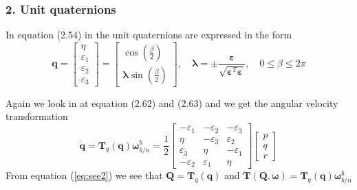 \subsubsection*{2. Unit quaternions}

In equation (2.54) in \cite{Fossen2011} the unit quaternions are expressed in the form 
\begin{equation}
    \mathbf{q}=
    \begin{bmatrix}
        \eta \\ \varepsilon_1 \\ \varepsilon_2 \\ \varepsilon_3
    \end{bmatrix}
    =
    \begin{bmatrix}
            \cos\left(\frac{\beta}{2}\right) \\ \boldsymbol{\lambda} \sin\left(\frac{\beta}{2}\right)
    \end{bmatrix}
    , \quad \boldsymbol{\lambda} = \pm \frac{\boldsymbol{\varepsilon}}{\sqrt{\boldsymbol{\varepsilon}^T\boldsymbol{\varepsilon}}}, \quad 0 \le \beta \le 2\pi
\end{equation}

Again we look in \cite{Fossen2011} at equation (2.62) and (2.63) and we get the angular velocity transformation
\begin{equation}\label{eq:see2}
    \dot{\boldsymbol{q}} = \boldsymbol{T}_q(\boldsymbol{q})\boldsymbol{\omega}_{b/n}^b
    = \frac{1}{2}
    \begin{bmatrix}
    -\varepsilon_1 & -\varepsilon_2 & -\varepsilon_3\\
    \eta & -\varepsilon_3 & \varepsilon_2 \\
    \varepsilon_3 & \eta & -\varepsilon_1 \\
    -\varepsilon_2 & \varepsilon_1 & \eta
    \end{bmatrix}
    \begin{bmatrix}
   p \\ q \\ r
    \end{bmatrix}
\end{equation}
From equation (\ref{eq:see2}) we see that $\boldsymbol{Q} =\boldsymbol{T}_q(\boldsymbol{q})$ and $\mathbf{T}(\boldsymbol{Q,\omega}) = \boldsymbol{T}_q(\boldsymbol{q})\boldsymbol{\omega}_{b/n}^b$ 







